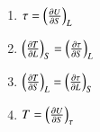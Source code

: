 \documentclass[journal]{IEEEtran}
\numberwithin{equation}{enumi}
\numberwithin{figure}{enumi}
\begin{document}
\begin{enumerate}
		\hfill{}

		\begin{multicols}{4}
			\begin{enumerate}
				\item $\tau = \left(\frac{\partial U}{\partial S}\right)_L$ 
				\item $\left(\frac{\partial T}{\partial L}\right)_S = \left(\frac{\partial \tau}{\partial S}\right)_L$
				\item $\left(\frac{\partial T}{\partial S}\right)_L = \left(\frac{\partial \tau}{\partial L}\right)_S$
				\item $T = \left(\frac{\partial U}{\partial S}\right)_{\tau}$
			\end{enumerate}
		\end{multicols}
\end{enumerate}
\end{document}
